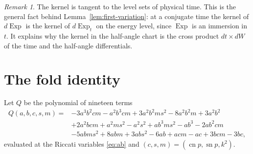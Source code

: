 \documentclass[11pt]{article}
\theoremstyle{remark}
\newtheorem{remark}[theorem]{Remark}
\newcommand{\sn}{\operatorname{sn}}
\newcommand{\cn}{\operatorname{cn}}
\newcommand{\Exp}{\operatorname{Exp}}
\begin{document}
\begin{remark}
The kernel is tangent to the level sets of physical time.  This is the
general fact behind Lemma~\ref{lem:first-variation}: at a conjugate time
the kernel of $d\Exp$ is the kernel of $d\Exp_t$ on the energy level, since
$\Exp$ is an immersion in $t$.  It explains why the kernel in the
half-angle chart is the cross product $dt\times dW$ of the time and the
half-angle differentials.
\end{remark}

\section{The fold identity}\label{sec:fold}

Let $Q$ be the polynomial of nineteen terms
\begin{equation}\label{eq:Q}
 \begin{aligned}
 Q(a,b,c,s,m)={}&-3a^3b^2cm-a^2b^3cm+3a^2b^2ms^2-8a^2b^2m+3a^2b^2\\
 &+2a^2bcm+a^2ms^2-a^2s^2+ab^3ms^2-ab^3-2ab^2cm\\
 &-5abms^2+8abm+3abs^2-6ab+acm-ac+3bcm-3bc,
 \end{aligned}
\end{equation}
evaluated at the Riccati variables \eqref{eq:ab} and $(c,s,m)=(\cn p,\sn p,k^2)$.
\end{document}
